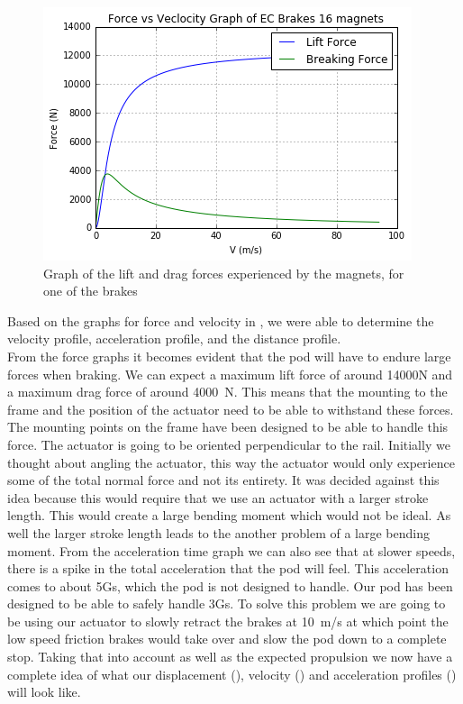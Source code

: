 \documentclass[main.tex]{subfiles}
\begin{document}
    \begin{figure}
        \centering
        \includegraphics[width=\linewidth]{images/force_velocity_graph_16_magnets.png}
        \caption{Graph of the lift and drag forces experienced by the magnets, for one of the brakes}
        \label{fig:force-velocity-graph}
    \end{figure}
    Based on the graphs for force and velocity in , we were able to determine the velocity profile, acceleration profile, and the distance profile.\\
    From the force graphs it becomes evident that the pod will have to endure large forces when braking. We can expect a maximum lift force of around 14000N and a maximum drag force of around \SI{4000}{N}. This means that the mounting to the frame and the position of the actuator need to be able to withstand these forces. The mounting points on the frame have been designed to be able to handle this force. The actuator is going to be oriented perpendicular to the rail. Initially we thought about angling the actuator, this way the actuator would only experience some of the total normal force and not its entirety. It was decided against this idea because this would require that we use an actuator with a larger stroke length. This would create a large bending moment which would not be ideal. As well the larger stroke length leads to the another problem of a large bending moment.
    From the acceleration time graph we can also see that at slower speeds, there is a spike in the total acceleration that the pod will feel. This acceleration comes to about 5Gs, which the pod is not designed to handle. Our pod has been designed to be able to safely handle 3Gs. To solve this problem we are going to be using our actuator to slowly retract the brakes at \SI{10}{m/s} at which point the low speed friction brakes would take over and slow the pod down to a complete stop. 
   Taking that into account as well as the expected propulsion we now have a complete idea of what our displacement (), velocity () and acceleration profiles () will look like.
   
\end{document}
